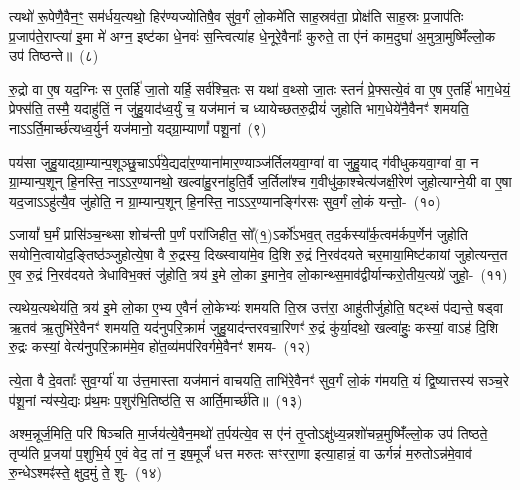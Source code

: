 त्यथो॑ रू॒पेणै॒वैन॒ꣳ॒ सम॑र्धय॒त्यथो॒ हिर॑ण्यज्योतिषै॒व सु॑व॒र्गं लो॒कमे॑ति साह॒स्रव॑ता॒ प्रोक्ष॑ति साह॒स्रः प्र॒जा\-प॑तिः प्र॒जा\-प॑ते॒राप्त्या॑ इ॒मा मे॑ अग्न॒ इष्ट॑का धे॒नवः॑ स॒न्त्वित्या॑ह धे॒नूरे॒वैनाः᳚ कुरुते॒ ता ए॑नं काम॒दुघा॑ अ॒मुत्रा॒मुष्मिँ॑ल्लो॒क उप॑ तिष्ठन्ते॥~(८)\ip

{\anuvakamend[{सयो॑निमे॒ता वै क॑रो॒त्येका॒न्नच॑त्वारि॒ꣳ॒शच्च॑}]}

रु॒द्रो वा ए॒ष यद॒ग्निः स ए॒तर्\mbox{}हि॑ जा॒तो यर्\mbox{}हि॒ सर्व॑श्चि॒तः स यथा॑ व॒थ्सो जा॒तः स्तनं॑ प्रे॒फ्सत्ये॒वं वा ए॒ष ए॒तर्\mbox{}हि॑ भाग॒\-धेयं॒ प्रेफ्स॑ति॒ तस्मै॒ यदाहु॑तिं॒ न जु॑हु॒याद॑ध्व॒र्युं च॒ यज॑मानं च ध्यायेच्छतरु॒द्रीयं॑ जुहोति भाग॒\-धेये॑नै॒वैनꣳ॑ शमयति॒ नाऽऽर्ति॒मार्च्छ॑त्यध्व॒र्युर्न यज॑मानो॒ यद्ग्रा॒म्याणां᳚ पशू॒नां~(९)\ip

पय॑सा जुहु॒याद्ग्रा॒म्यान्प॒शूञ्छु॒चा\-ऽर्प॑ये॒द्यदा॑र॒ण्याना॑मार॒ण्याञ्ज॑र्तिलयवा॒ग्वा॑ वा जुहु॒याद् ग॑वीधुकयवा॒ग्वा॑ वा॒ न ग्रा॒म्यान्प॒शून् हि॒नस्ति॒ ना\-ऽऽर॒ण्यानथो॒ खल्वा॑हु॒रना॑हुति॒र्वै ज॒र्तिला᳚श्च ग॒वीधु॑का॒श्चेत्य॑जक्षी॒रेण॑ जुहोत्याग्ने॒यी वा ए॒षा यद॒जा\-ऽऽ\-हु॑त्यै॒व जु॑होति॒ न ग्रा॒म्यान्प॒शून् हि॒नस्ति॒ ना\-ऽऽ\-र॒ण्यानङ्गि॑रसः सुव॒र्गं लो॒कं यन्तो॒-~(१०)\ip

ऽजायां᳚ घ॒र्मं प्रासि॑ञ्च॒न्थ्सा शोच॑न्ती प॒र्णं परा॑जिहीत॒ सो᳚(१॒)\-ऽर्को॑\-ऽभव॒त् तद॒र्कस्या᳚र्क॒त्वम॑र्क\-प॒र्णेन॑ जुहोति सयोनि॒त्वायोद॒ङ्तिष्ठ॑ञ्जुहोत्ये॒षा वै रु॒द्रस्य॒ दिख्स्वाया॑मे॒व दि॒शि रु॒द्रं नि॒रव॑दयते चर॒माया॒मिष्ट॑कायां जुहोत्यन्त॒त ए॒व रु॒द्रं नि॒रव॑दयते त्रेधाविभ॒क्तं जु॑होति॒ त्रय॑ इ॒मे लो॒का इ॒माने॒व लो॒कान्थ्स॒माव॑द्वीर्यान्करो॒तीय॒त्यग्रे॑ जुहो॒-~(११)\ip

त्यथेय॒त्यथेय॑ति॒ त्रय॑ इ॒मे लो॒का ए॒भ्य ए॒वैनं॑ लो॒केभ्यः॑ शमयति ति॒स्र उत्त॑रा॒ आहु॑तीर्जुहोति॒ षट्थ्सं प॑द्यन्ते॒ षड्वा ऋ॒तव॑ ऋ॒तुभि॑रे॒वैनꣳ॑ शमयति॒ यद॑नुपरि॒क्रामं॑ जुहु॒याद॑न्तरवचा॒रिणꣳ॑ रु॒द्रं कु॑र्या॒दथो॒ खल्वा॑हुः॒ कस्यां॒ वाऽह॑ दि॒शि रु॒द्रः कस्यां॒ वेत्य॑नुपरि॒क्राम॑मे॒व हो॑त॒व्य॑मप॑रिवर्गमे॒वैनꣳ॑ शमय-~(१२)\ip

त्ये॒ता वै दे॒वताः᳚ सुव॒र्ग्या॑ या उ॑त्त॒मास्ता यज॑मानं वाचयति॒ ताभि॑रे॒वैनꣳ॑ सुव॒र्गं लो॒कं ग॑मयति॒ यं द्वि॒ष्यात्तस्य॑ सञ्च॒रे प॑शू॒नां न्य॑स्ये॒द्यः प्र॑थ॒मः प॒शुर॑भि॒तिष्ठ॑ति॒ स आर्ति॒मार्च्छ॑ति॥~(१३)\ip

{\anuvakamend[{प॒शू॒नां यन्तो\-ऽग्रे॑ जुहो॒त्यप॑रिवर्गमे॒वैनꣳ॑ शमयति त्रि॒ꣳ॒शच्च॑}]}

अश्म॒न्नूर्ज॒मिति॒ परि॑ षिञ्चति मा॒र्जय॑त्ये॒वैन॒मथो॑ त॒र्पय॑त्ये॒व स ए॑नं तृ॒प्तो\-ऽक्षु॑ध्य॒न्नशो॑चन्न॒मुष्मिँ॑ल्लो॒क उप॑ तिष्ठते॒ तृप्य॑ति प्र॒जया॑ प॒शुभि॒र्य ए॒वं वेद॒ तां न॒ इष॒मूर्जं॑ धत्त मरुतः सꣳररा॒णा इत्या॒हान्नं॒ वा ऊर्गन्नं॑ म॒रुतो\-ऽन्न॑मे॒वाव॑ रु॒न्धे\-ऽश्मꣴ॑स्ते॒ क्षुद॒मुं ते॒ शु-~(१४)\ip

